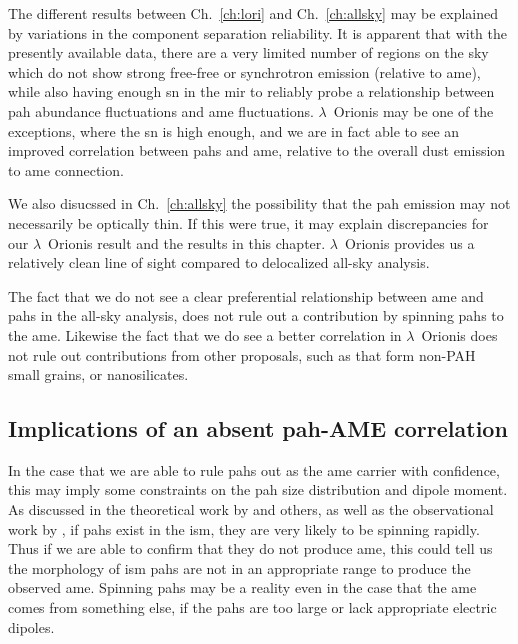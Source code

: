               The different results between Ch.~\ref{ch:lori} and Ch.~\ref{ch:allsky} may be explained by variations in the component separation reliability. It is apparent that with the presently available data, there are a very limited number of regions on the sky which do not show strong free-free or synchrotron emission (relative to \gls{ame}), while also having enough \gls{sn} in the \gls{mir} to reliably probe a relationship between \gls{pah} abundance fluctuations and \gls{ame} fluctuations. $\lambda$~Orionis may be one of the exceptions, where the \gls{sn} is high enough, and we are in fact able to see an improved correlation between \gls{pah}s and \gls{ame}, relative to the overall dust emission to \gls{ame} connection.

              We also disucssed in Ch.~\ref{ch:allsky} the possibility that the \gls{pah} emission may not necessarily be optically thin. If this were true, it may explain discrepancies for our $\lambda$~Orionis result and the results in this chapter. $\lambda$~Orionis provides us a relatively clean line of sight compared to delocalized all-sky analysis.

              The fact that we do not see a clear preferential relationship between \gls{ame} and \gls{pah}s in the all-sky analysis, does not rule out a contribution by spinning \gls{pah}s to the \gls{ame}. Likewise the fact that we do see a better correlation in $\lambda$~Orionis does not rule out contributions from other proposals, such as that form non-PAH small grains, or nanosilicates.


              \subsection{Implications of an absent \gls{pah}-AME correlation}
                  In the case that we are able to rule \gls{pah}s out as the \gls{ame} carrier with confidence, this may imply some constraints on the \gls{pah} size distribution and dipole moment. As discussed in the theoretical work by \cite{draine98a, ali-haimoud10} and others, as well as the observational work by \cite{hensley16}, if \gls{pah}s exist in the \gls{ism}, they are very likely to be spinning rapidly. Thus if we are able to confirm that they do not produce \gls{ame}, this could tell us the morphology of \gls{ism} \gls{pah}s are not in an appropriate range to produce the observed \gls{ame}. Spinning \gls{pah}s may be a reality even in the case that the \gls{ame} comes from something else, if the \gls{pah}s are too large or lack appropriate electric dipoles.

